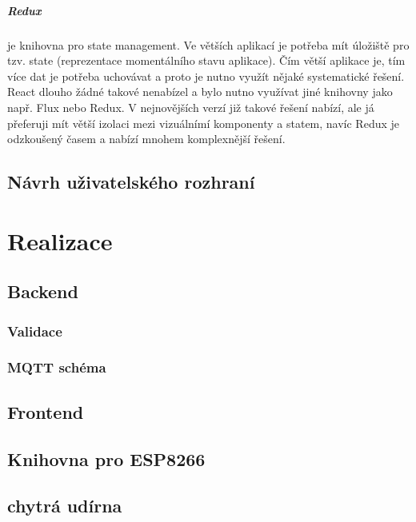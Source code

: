 \documentclass[thesis=B,czech]{FITthesis}[2019/12/23]
\begin{document}
\paragraph{Redux} je knihovna pro state management. Ve větších aplikací je potřeba mít úložiště pro tzv. state (reprezentace momentálního stavu aplikace). Čím větší aplikace je, tím více dat je potřeba uchovávat a proto je nutno využít nějaké systematické řešení. React dlouho žádné takové nenabízel a bylo nutno využívat jiné knihovny jako např. Flux nebo Redux. V nejnovějších verzí již takové řešení nabízí, ale já přeferuji mít větší izolaci mezi vizuálnímí komponenty a statem, navíc Redux je odzkoušený časem a nabízí mnohem komplexnější řešení.


\section{Návrh uživatelského rozhraní}




\chapter{Realizace}

\section{Backend}

\subsection{Validace}

\subsection{MQTT schéma}

\section{Frontend}

\section{Knihovna pro ESP8266}

\section{chytrá udírna}
\end{document}
